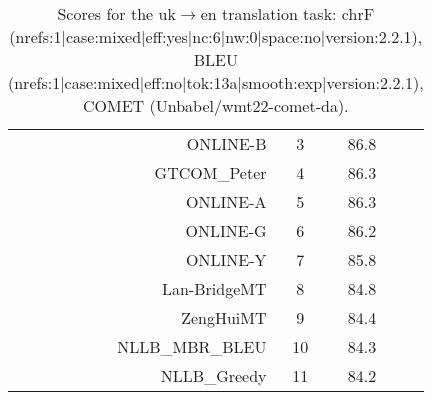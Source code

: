 \documentclass[11pt]{article}
\begin{document}
\begin{table}
\begin{subtable}[t]{0.33\textwidth}
\begin{tabular}{rccc}
ONLINE-B & 3 & 86.8 \\ 
GTCOM\_Peter & 4 & 86.3 \\ 
ONLINE-A & 5 & 86.3 \\ 
ONLINE-G & 6 & 86.2 \\ 
ONLINE-Y & 7 & 85.8 \\ 
Lan-BridgeMT & 8 & 84.8 \\ 
ZengHuiMT & 9 & 84.4 \\ 
NLLB\_MBR\_BLEU & 10 & 84.3 \\ 
NLLB\_Greedy & 11 & 84.2 \\ 
\bottomrule 
\end{tabular} 
\end{subtable} 
\caption{Scores for the uk$\rightarrow$en translation task: chrF (nrefs:1|case:mixed|eff:yes|nc:6|nw:0|space:no|version:2.2.1), BLEU (nrefs:1|case:mixed|eff:no|tok:13a|smooth:exp|version:2.2.1), COMET (Unbabel/wmt22-comet-da).} 
\end{table} 
\end{document}
